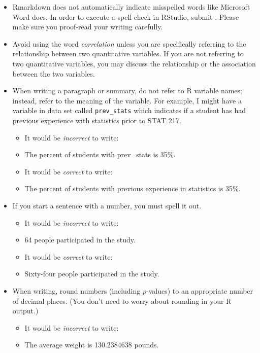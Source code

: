 \documentclass[letterpaper,12pt]{report}
\begin{document}
\clearpage
{}
\begin{itemize}
    \item Rmarkdown does not automatically indicate misspelled words like Microsoft Word does.  In order to execute a spell check in RStudio, submit . Please make sure you proof-read your writing carefully.
    \item Avoid using the word \emph{correlation} unless you are specifically referring to the relationship between two quantitative variables.  If you are not referring to two quantitative variables, you may discuss the relationship or the association between the two variables.
     \item When writing a paragraph or summary, do not refer to R variable names; instead, refer to the meaning of the variable.  For example, I might have a variable in data set called \texttt{prev\_stats} which indicates if a student has had previous experience with statistics prior to STAT 217.
    \begin{itemize}
        \item It would be \emph{incorrect} to write:
        \item[] The percent of students with prev\_stats is 35\%.
        \item It would be \emph{correct} to write:
        \item[] The percent of students with previous experience in statistics is 35\%.
    \end{itemize}
    \item If you start a sentence with a number, you must spell it out.
            \begin{itemize}
        \item It would be \emph{incorrect} to write:
        \item[] 64 people participated in the study.
        \item It would be \emph{correct} to write:
        \item[] Sixty-four people participated in the study.
    \end{itemize}
    \item When writing, round numbers (including $p$-values) to an appropriate number of decimal places.  (You don't need to worry about rounding in your R output.)
        \begin{itemize}
        \item It would be \emph{incorrect} to write:
        \item[] The average weight is 130.2384638 pounds.

\end{itemize}
\end{itemize}
\end{document}
